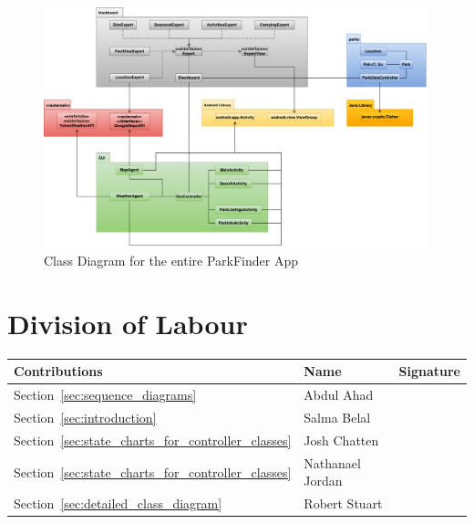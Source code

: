 \documentclass[titlepage,12pt]{article}
\begin{document}
\begin{figure}[H]
    \centerline{\includegraphics[width=0.99\textwidth]{class_diagrams/all(small_colour)_ClassDiagram}}
    \caption{Class Diagram for the entire ParkFinder App}
    \label{fig:all_classDiagram}
\end{figure}


\appendix
\section{Division of Labour}
\label{sec:division_of_labour}

\begin{table}[H]
\vspace{-0.06in}
\begin{center}
\setlength{\extrarowheight}{4.0pt}
\begin{tabular}{m{} m{} m{}} 
\hline
\textbf{Contributions} & \textbf{Name} & \textbf{Signature}\\
\hline
Section~\ref{sec:sequence_diagrams} & Abdul Ahad & \\
\hline
Section~\ref{sec:introduction} & Salma Belal & \\
\hline
Section~\ref{sec:state_charts_for_controller_classes} & Josh Chatten & \\
\hline
Section~\ref{sec:state_charts_for_controller_classes} & Nathanael Jordan  & \\
\hline
Section~\ref{sec:detailed_class_diagram} & Robert Stuart & \\
\hline
\end{tabular}
\end{center}
\label{divOfLabour}
\end{table}
\end{document}
